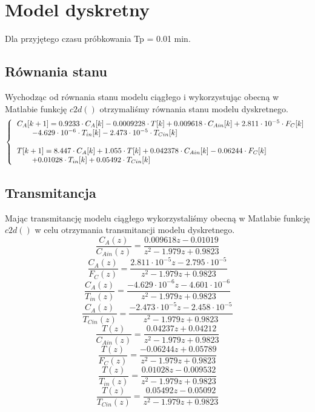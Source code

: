\chapter{Model dyskretny}
Dla przyjętego czasu próbkowania Tp = 0.01 min.
\section{Równania stanu}
Wychodząc od równania stanu modelu ciągłego i wykorzystując obecną w Matlabie funkcję $c2d()$ otrzymaliśmy równania stanu modelu dyskretnego.
\begin{equation}
	\left\{
	\begin{tabular}{l}
	$C_A[k+1] = 0.9233\cdot C_A[k]  -0.0009228\cdot T[k]+ 0.009618\cdot C_{Ain}[k]+  2.811\cdot 10^{-5}\cdot F_C[k]$\\
	$\quad \quad -4.629\cdot 10^{-6}\cdot T_{in}[k]  -2.473\cdot 10^{-5}\cdot T_{Cin}[k]$\\\\
	$T[k+1] = 8.447\cdot C_A[k] +1.055\cdot T[k]+ 0.042378\cdot C_{Ain}[k]-0.06244\cdot F_C[k]$\\
	$\quad \quad +0.01028\cdot T_{in}[k]  +0.05492\cdot T_{Cin}[k]$\\
	\end{tabular}
	\right.
\end{equation}
\section{Transmitancja}
Mając transmitancję modelu ciągłego wykorzystaliśmy obecną w Matlabie funkcję $c2d()$ w celu otrzymania transmitancji modelu dyskretnego.
\begin{equation}
	\frac{C_A(z)}{C_{Ain}(z)} = \frac{0.009618z-0.01019}{z^2-1.979z+0.9823}
\end{equation}
\begin{equation}
\frac{C_A(z)}{F_C(z)} = \frac{2.811\cdot10^{-5}z-2.795\cdot10^{-5}}{z^2-1.979z+0.9823}
\end{equation}
\begin{equation}
\frac{C_A(z)}{T_{in}(z)} = \frac{-4.629\cdot10^{-6} z - 4.601\cdot10^{-6}}{z^2-1.979z+0.9823}
\end{equation}
\begin{equation}
\frac{C_A(z)}{T_{Cin}(z)} = \frac{-2.473\cdot10^{-5} z - 2.458\cdot 10^{-5}}{z^2-1.979z+0.9823}
\end{equation}
\begin{equation}
\frac{T(z)}{C_{Ain}(z)} = \frac{0.04237 z + 0.04212}{z^2-1.979z+0.9823}
\end{equation}
\begin{equation}
\frac{T(z)}{F_C(z)} = \frac{-0.06244 z + 0.05789}{z^2-1.979z+0.9823}
\end{equation}
\begin{equation}
\frac{T(z)}{T_{in}(z)} = \frac{0.01028 z - 0.009532}{z^2-1.979z+0.9823}
\end{equation}
\begin{equation}
\frac{T(z)}{T_{Cin}(z)} = \frac{0.05492 z - 0.05092}{z^2-1.979z+0.9823}
\end{equation}

